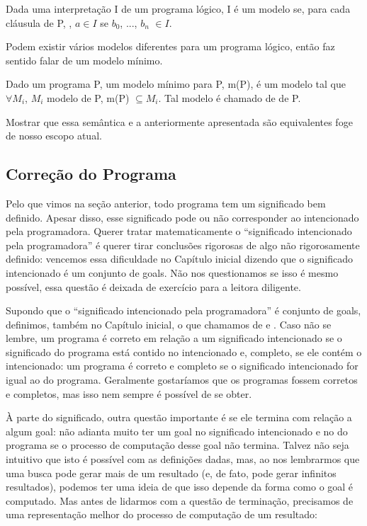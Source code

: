 \documentclass{article}
\begin{document}
\begin{definition} Dada uma interpretação I de um programa lógico, I é um modelo se, para cada cláusula de P, , $a \in I$ se $b_0$, ..., $b_n$ $\in I$.
\end{definition}

 Podem existir vários modelos diferentes para um programa lógico, então faz sentido falar de um modelo mínimo.

\begin{definition} Dado um programa P, um modelo mínimo para P, m(P), é um modelo tal que $\forall M_i$, $M_i$ modelo de P, m(P) $\subseteq M_i$. Tal modelo é chamado de  de P.
\end{definition}

Mostrar que essa semântica e a anteriormente apresentada são equivalentes foge de nosso escopo atual.

\subsection{Correção do Programa}

Pelo que vimos na seção anterior, todo programa tem um significado bem definido. Apesar disso, esse significado pode ou não corresponder ao intencionado pela programadora. Querer tratar matematicamente o ``significado intencionado pela programadora'' é querer tirar conclusões rigorosas de algo não rigorosamente definido: vencemos essa dificuldade no Capítulo inicial dizendo que o significado intencionado é um conjunto de goals. Não nos questionamos se
isso é mesmo possível, essa questão é deixada de exercício para a leitora diligente.

Supondo que o ``significado intencionado pela programadora'' é conjunto de goals, definimos, também no Capítulo inicial, o que chamamos de  e . Caso não se lembre, um programa é correto em relação a um significado intencionado se o significado do programa está contido no intencionado e, completo, se ele contém o intencionado: um programa é correto e completo se o significado intencionado for igual ao do programa.
Geralmente gostaríamos que os programas fossem corretos e completos, mas isso nem sempre é possível de se obter.

À parte do significado, outra questão importante é se ele termina com relação a algum goal: não adianta muito ter um goal no significado intencionado e no do programa se o processo de computação desse goal não termina. Talvez não seja intuitivo que isto é possível com as definições dadas, mas, ao nos lembrarmos que uma busca pode gerar mais de um resultado (e, de fato, pode gerar infinitos resultados), podemos ter uma ideia de que isso depende da forma como o goal é
computado. Mas antes de lidarmos com a questão de terminação, precisamos de uma representação melhor do processo de computação de um resultado:
\end{document}
